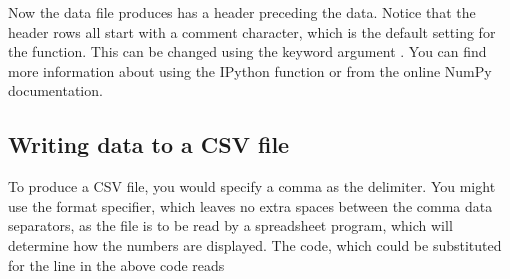 \documentclass[letterpaper,10pt,english]{sphinxmanual}
\begin{document}
\sphinxAtStartPar
Now the data file produces has a header preceding the data.  Notice that the header rows all start with a \sphinxcode{\sphinxupquote{\#}} comment character, which is the default setting for the  function. This can be changed using the keyword argument .  You can find more information about  using the IPython  function or from the online NumPy documentation.

\begin{sphinxVerbatim}[commandchars=\\\{\},numbers=left,firstnumber=1,stepnumber=1]
                                     
                                     
                                     
                                     
                                     
                                     
                                     
                                     
                                      
                                      
                                     
                                     
                                      
\end{sphinxVerbatim}


\subsection{Writing data to a CSV file}
\label{\detokenize{chap4/chap4_io:writing-data-to-a-csv-file}}
\sphinxAtStartPar
To produce a CSV file, you would specify a comma as the delimiter.  You might use the  format specifier, which leaves no extra spaces between the comma data separators, as the file is to be read by a spreadsheet program, which will determine how the numbers are displayed.  The code, which could be substituted for the  line in the above code reads
\end{document}

